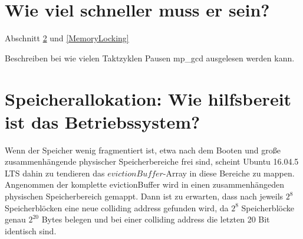 
















\section{Wie viel schneller muss er sein?}

Abschnitt \ref{} und \ref{MemoryLocking}

Beschreiben bei wie vielen Taktzyklen Pausen mp_gcd ausgelesen werden kann.

\section{Speicherallokation: Wie hilfsbereit ist das Betriebssystem?}

Wenn der Speicher wenig fragmentiert ist, etwa nach dem Booten und große zusammenhängende physischer Speicherbereiche frei sind, scheint Ubuntu 16.04.5 LTS dahin zu tendieren das $evictionBuffer$-Array in diese Bereiche zu mappen.
Angenommen der komplette evictionBuffer wird in einen zusammenhängeden physischen Speicherbereich gemappt. Dann ist zu erwarten, dass nach jeweils $2^8$ Speicherblöcken eine neue colliding address gefunden wird, da $2^8$ Speicherblöcke genau $2^20$ Bytes belegen und bei einer colliding address die letzten 20 Bit identisch sind.

